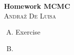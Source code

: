 \documentclass[12pt]{article}
\begin{document}
\begin{center}

\Huge{\textbf{Homework MCMC}} \\
\textsc{\Large{Andraž De Luisa}} \\

\end{center}

\begin{enumerate}[A)]

    \item Exercise
    
    \item 

\end{enumerate}
\end{document}
